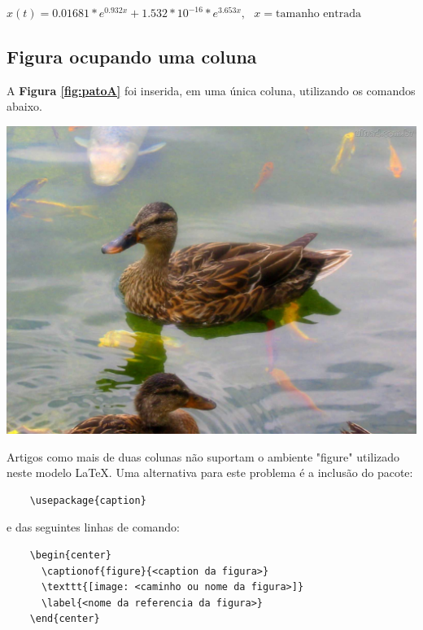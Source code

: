 $x(t)=0.01681*e^{0.932x} + 1.532*10^{-16}*e^{3.653x}, \textrm{ }x=\textrm{tamanho entrada}$




\subsection{Figura ocupando uma coluna}		%

A \textbf{Figura \ref{fig:patoA}} foi inserida, em uma única coluna, utilizando os comandos abaixo.

\begin{center}
  \includegraphics[scale=0.08]{./02-figuras/pato}
  \label{fig:patoA}
\end{center}

Artigos como mais de duas colunas não suportam o ambiente "figure" utilizado neste modelo \LaTeX. Uma alternativa para este problema é a inclusão do pacote:

{\tiny
\begin{verbatim}
    \usepackage{caption}
\end{verbatim}
}

e das seguintes linhas de comando:

{\tiny
\begin{verbatim}
    \begin{center}
      \captionof{figure}{<caption da figura>} 
      \texttt{[image: <caminho ou nome da figura>]}
      \label{<nome da referencia da figura>}
    \end{center}
\end{verbatim}
}



